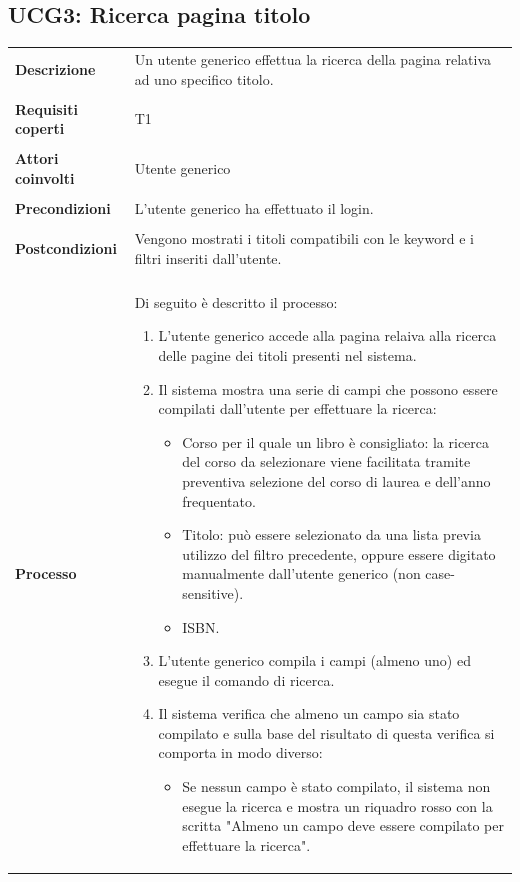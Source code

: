 \documentclass[10pt,a4paper]{report}
\begin{document}
	\subsection{UCG3: Ricerca pagina titolo}
	\begin{tabular}{lp{}}
		\textbf{Descrizione}&Un utente generico effettua la ricerca della pagina relativa ad uno specifico titolo.\\
		\\
		\textbf{Requisiti coperti}&T1\\
		\\
		\textbf{Attori coinvolti}&Utente generico\\
		\\
		\textbf{Precondizioni}&L'utente generico ha effettuato il login.\\
		\\
		\textbf{Postcondizioni}&Vengono mostrati i titoli compatibili con le keyword e i filtri inseriti dall'utente.\\
		\\
		\textbf{Processo}&Di seguito è descritto il processo:
		\begin{enumerate}
			\item L'utente generico accede alla pagina relaiva alla ricerca delle pagine dei titoli presenti nel sistema.
			\item Il sistema mostra una serie di campi che possono essere compilati dall'utente per effettuare la ricerca:
			\begin{itemize}
				\item Corso per il quale un libro è consigliato: la ricerca del corso da selezionare viene facilitata tramite preventiva selezione del corso di laurea e dell'anno frequentato.
				\item Titolo: può essere selezionato da una lista previa utilizzo del filtro precedente, oppure essere digitato manualmente dall'utente generico (non case-sensitive).
				\item ISBN.			
			\end{itemize}
			\item L'utente generico compila i campi (almeno uno) ed esegue il comando di ricerca.
			\item Il sistema verifica che almeno un campo sia stato compilato e sulla base del risultato di questa verifica si comporta in modo diverso:
			\begin{itemize}
				\item Se nessun campo è stato compilato, il sistema non esegue la ricerca e mostra un riquadro rosso con la scritta "Almeno un campo deve essere compilato per effettuare la ricerca".

\end{itemize}
\end{enumerate}
\end{tabular}
\end{document}

